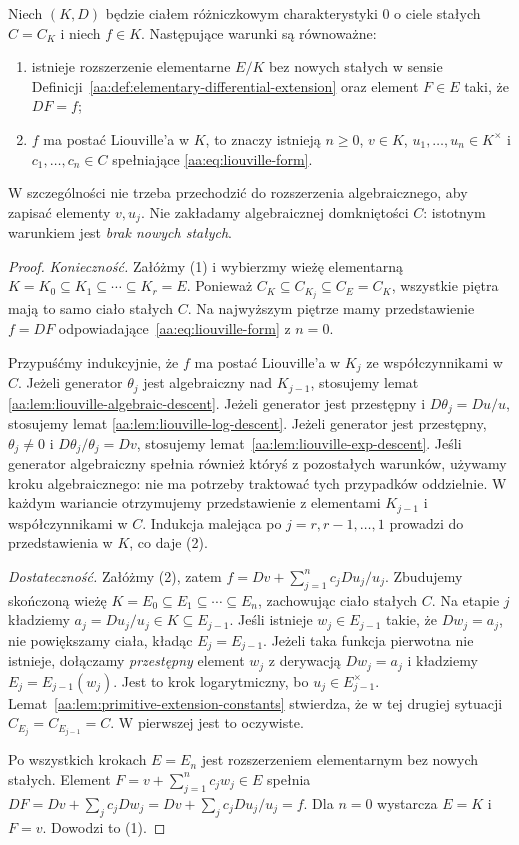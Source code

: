 \begin{twierdzenie}
\label{aa:tw:liouville-elementary-integration}
Niech $(K,D)$ będzie ciałem różniczkowym
charakterystyki $0$ o ciele stałych $C=C_K$
i niech $f\in K$.
Następujące warunki są równoważne:
\begin{enumerate}
\item istnieje rozszerzenie elementarne
$E/K$ bez nowych stałych w sensie
Definicji~\ref{aa:def:elementary-differential-extension}
oraz element $F\in E$ taki, że $DF=f$;
\item $f$ ma postać Liouville'a w $K$, to znaczy
istnieją $n\ge0$, $v\in K$, $u_1,\ldots,u_n\in K^\times$
i $c_1,\ldots,c_n\in C$ spełniające
\eqref{aa:eq:liouville-form}.
\end{enumerate}
W szczególności nie trzeba przechodzić do rozszerzenia
algebraicznego, aby zapisać elementy $v,u_j$.
Nie zakładamy algebraicznej domkniętości $C$:
istotnym warunkiem jest \emph{brak nowych stałych}.
\end{twierdzenie}
\begin{proof}
\emph{Konieczność.} Załóżmy (1) i wybierzmy wieżę
elementarną $K=K_0\subseteq K_1\subseteq\cdots
\subseteq K_r=E$. Ponieważ
$C_K\subseteq C_{K_j}\subseteq C_E=C_K$,
wszystkie piętra mają to samo ciało stałych $C$.
Na najwyższym piętrze mamy przedstawienie
$f=DF$ odpowiadające~\eqref{aa:eq:liouville-form}
z $n=0$.

Przypuśćmy indukcyjnie, że $f$ ma postać
Liouville'a w $K_j$ ze współczynnikami w $C$.
Jeżeli generator $\theta_j$ jest algebraiczny
nad $K_{j-1}$, stosujemy lemat
\ref{aa:lem:liouville-algebraic-descent}.
Jeżeli generator jest przestępny i
$D\theta_j=Du/u$, stosujemy lemat
\ref{aa:lem:liouville-log-descent}.
Jeżeli generator jest przestępny,
$\theta_j\ne0$ i $D\theta_j/\theta_j=Dv$,
stosujemy lemat~\ref{aa:lem:liouville-exp-descent}.
Jeśli generator algebraiczny spełnia również
któryś z pozostałych warunków, używamy kroku
algebraicznego: nie ma potrzeby traktować
tych przypadków oddzielnie.
W każdym wariancie otrzymujemy przedstawienie
z elementami $K_{j-1}$ i współczynnikami w $C$.
Indukcja malejąca po $j=r,r-1,\ldots,1$
prowadzi do przedstawienia w $K$, co daje (2).

\emph{Dostateczność.} Załóżmy (2), zatem
$f=Dv+\sum_{j=1}^n c_j Du_j/u_j$.
Zbudujemy skończoną wieżę
$K=E_0\subseteq E_1\subseteq\cdots\subseteq E_n$,
zachowując ciało stałych $C$.
Na etapie $j$ kładziemy $a_j=Du_j/u_j\in K
\subseteq E_{j-1}$. Jeśli istnieje
$w_j\in E_{j-1}$ takie, że $Dw_j=a_j$,
nie powiększamy ciała, kładąc $E_j=E_{j-1}$.
Jeżeli taka funkcja pierwotna nie istnieje,
dołączamy \emph{przestępny} element $w_j$
z derywacją $Dw_j=a_j$ i kładziemy
$E_j=E_{j-1}(w_j)$. Jest to krok
logarytmiczny, bo $u_j\in E_{j-1}^\times$.
Lemat~\ref{aa:lem:primitive-extension-constants}
stwierdza, że w tej drugiej sytuacji
$C_{E_j}=C_{E_{j-1}}=C$. W pierwszej jest
to oczywiste.

Po wszystkich krokach $E=E_n$ jest
rozszerzeniem elementarnym bez nowych stałych.
Element $F=v+\sum_{j=1}^n c_jw_j\in E$
spełnia
$DF=Dv+\sum_jc_jDw_j
=Dv+\sum_jc_j Du_j/u_j=f$.
Dla $n=0$ wystarcza $E=K$ i $F=v$.
Dowodzi to (1).
\end{proof}


